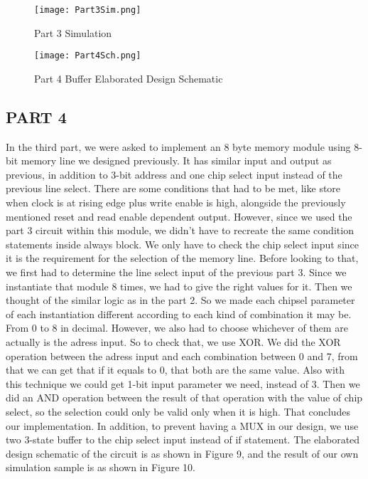 \documentclass[pdftex,12pt,a4paper]{article}
\begin{document}
\begin{figure}[ht]
	\centering
	\texttt{[image: Part3Sim.png]}
	\caption{Part 3 Simulation}
	\label{fig1}
\end{figure}
\newpage
\begin{figure}[ht]
	\centering
	\texttt{[image: Part4Sch.png]}
	\caption{Part 4 Buffer Elaborated Design Schematic}
	\label{fig1}
\end{figure}

\subsection{PART 4}
In the third part, we were asked to implement an 8 byte memory module using 8-bit memory line we designed previously. It has similar input and output as previous, in addition to 3-bit address and one chip select input instead of the previous line select. There are some conditions that had to be met, like store when clock is at rising edge plus write enable is high, alongside the previously mentioned reset and read enable dependent output. However, since we used the part 3 circuit within this module, we didn't have to recreate the same condition statements inside always block. We only have to check the chip select input since it is the requirement for the selection of the memory line. Before looking to that, we first had to determine the line select input of the previous part 3. Since we instantiate that module 8 times, we had to give the right values for it. Then we thought of the similar logic as in the part 2. So we made each chipsel parameter of each instantiation different according to each kind of combination it may be. From 0 to 8 in decimal. However, we also had to choose whichever of them are actually is the adress input. So to check that, we use XOR. We did the XOR operation between the adress input and each combination between 0 and 7, from that we can get that if it equals to 0, that both are the same value. Also with this technique we could get 1-bit input parameter we need, instead of 3. Then we did an AND operation between the result of that operation with the value of chip select, so the selection could only be valid only when it is high. That concludes our implementation. In addition, to prevent having a MUX in our design, we use two 3-state buffer to the chip select input instead of if statement. The elaborated design schematic of the circuit is as shown in Figure 9, and the result of our own simulation sample is as shown in Figure 10. 
\end{document}
